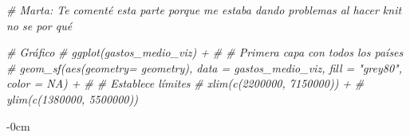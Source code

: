 \documentclass[data,article,submit,moreauthors,pdftex]{Definitions/mdpi}
\newenvironment{Shaded}{\begin{snugshade}}{\end{snugshade}}
\newcommand{\CommentTok}[1]{\textcolor[rgb]{0.56,0.35,0.01}{\textit{#1}}}
\begin{document}
\begin{Shaded}
\begin{Highlighting}[]
\CommentTok{\# Marta: Te comenté esta parte porque me estaba dando problemas al hacer knit no se por qué}

\CommentTok{\# Gráfico}
\CommentTok{\# ggplot(gastos\_medio\_viz) +}
\CommentTok{\#   \# Primera capa con todos los países}
\CommentTok{\#   geom\_sf(aes(geometry= geometry), data = gastos\_medio\_viz, fill = "grey80", color = NA) +}
\CommentTok{\#   \# Establece límites}
\CommentTok{\#   xlim(c(2200000, 7150000)) +}
\CommentTok{\#   ylim(c(1380000, 5500000))}
\end{Highlighting}
\end{Shaded}



\vspace{6pt}














\begin{adjustwidth}{-\extralength}{0cm}





%

\PublishersNote{}
\end{adjustwidth}
\end{document}
